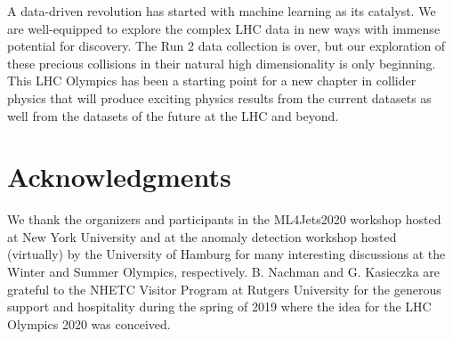 \documentclass[a4paper,11pt]{article}
\begin{document}
A data-driven revolution has started with machine learning as its catalyst.  We are well-equipped to explore the complex LHC data in new ways with immense potential for discovery.  The Run 2 data collection is over, but our exploration of these precious collisions in their natural high dimensionality is only beginning.  This LHC Olympics has been a starting point for a new chapter in collider physics that will produce exciting physics results from the current datasets as well from the datasets of the future at the LHC and beyond.

\clearpage

\section*{\label{sec::acknowledgments}Acknowledgments}


We thank the organizers and participants in the ML4Jets2020 workshop hosted at New York University and at the anomaly detection workshop hosted (virtually) by the University of Hamburg for many interesting discussions at the Winter and Summer Olympics, respectively.  B. Nachman and G. Kasieczka are grateful to the NHETC Visitor Program at Rutgers University for the generous support and hospitality during the spring of 2019 where the idea for the LHC Olympics 2020 was conceived.
\end{document}
